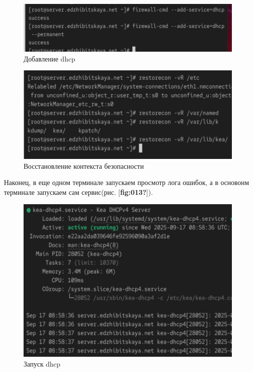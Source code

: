\documentclass[
  english,
  russian,
  12pt,
  a4paper,
  DIV=11,
  numbers=noendperiod]{scrreprt}
\begin{document}
\begin{figure}

{\centering \includegraphics[width=0.7\linewidth,height=\textheight,keepaspectratio]{image/11.jpg}

}

\caption{Добавление dhcp}

\end{figure}%

\begin{figure}

{\centering \includegraphics[width=0.7\linewidth,height=\textheight,keepaspectratio]{image/12.jpg}

}

\caption{Восстановление контекста безопасности}

\end{figure}%

Наконец, в еще одном терминале запускаем просмотр лога ошибок, а в
основонм терминале запускаем сам сервис(рис. {[}\textbf{fig:013?}{]}).

\begin{figure}

{\centering \includegraphics[width=0.7\linewidth,height=\textheight,keepaspectratio]{image/13.jpg}

}

\caption{Запуск dhcp}

\end{figure}%
\end{document}
